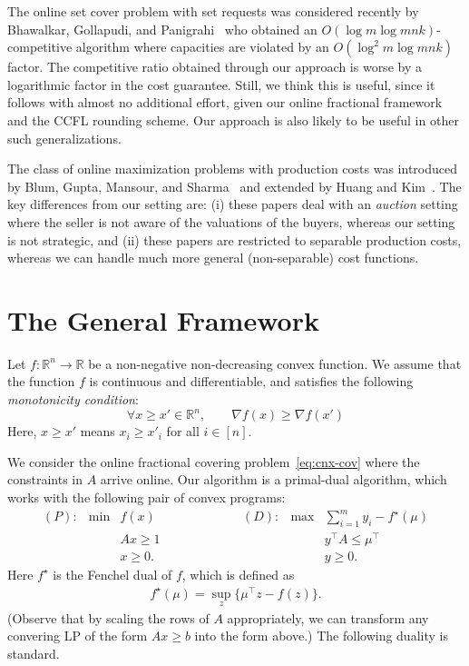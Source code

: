\documentclass[letterpaper,11pt]{article}
\def \RR   {{\mathbb R}}
\newcommand{\trans}{\intercal}
\begin{document}
The online set cover problem with set requests was considered recently
by Bhawalkar, Gollapudi, and Panigrahi~\cite{BGP14} who obtained an
$O(\log m\log mnk)$-competitive algorithm where capacities are violated
by an $O(\log^2 m\log mnk)$ factor. The competitive ratio obtained
through our approach is worse by a logarithmic factor in the cost
guarantee. Still, we think this is useful, since it follows with almost
no additional effort, given our online fractional framework and the CCFL
rounding scheme. Our approach is also likely to be useful in other such
generalizations.

The class of online maximization problems with production costs was
introduced by Blum, Gupta, Mansour, and Sharma~\cite{BGMS11} and
extended by Huang and Kim~\cite{HK15}. The key differences from our
setting are: (i) these papers deal with an {\em auction} setting where
the seller is not aware of the valuations of the buyers, whereas our
setting is not strategic, and (ii) these papers are restricted to
separable production costs, whereas we can handle much more general
(non-separable) cost functions.


\section{The General Framework}
\label{sec:general}

Let $f:\RR^n\rightarrow \RR$ be a non-negative non-decreasing convex
function. We assume that the function $f$ is continuous and
differentiable, and satisfies the following \emph{monotonicity
  condition}:
\begin{equation}
  \forall x \geq x' \in \RR^n,  \qquad \nabla f(x) \geq \nabla
  f(x') \label{prop-grad}
\end{equation}
 Here, $x \geq x'$ means $x_i \geq x'_i$ for all $i \in [n]$.

We consider the online fractional covering problem~\eqref{eq:cnx-cov}
where the constraints in $A$ arrive online. Our algorithm is a
primal-dual algorithm, which works with the following pair of convex
programs:
$$\begin{array}{lll|lll}
(P): &  \min &f(x) \qquad\qquad &\qquad  (D): &  \max &\sum_{i=1}^{m} y_i - f^\star(\mu) \\
&&Ax\ge 1 & & & y^\trans A \leq \mu^\trans \\
&& x\ge 0.  & &&  y\ge 0.
\end{array}
$$
Here $f^\star$ is the Fenchel dual of $f$, which is defined
as
\begin{gather}
  f^\star(\mu) = \sup_z \{ \mu^\trans z - f(z)\}. \label{eq:fenchel}
\end{gather}
 (Observe that by
scaling the rows of $A$ appropriately, we can transform any convering LP
of the form $Ax \geq b$ into the form above.) The following duality is
standard.
\end{document}
